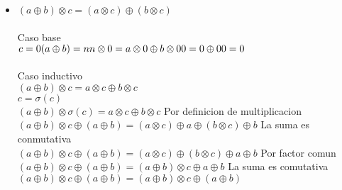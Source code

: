 \documentclass{article}
\begin{document}
\begin{itemize}
        
        \item{$(a\oplus b)\otimes c = (a\otimes c) \oplus (b \otimes c)$}\\
        \\
        Caso base\\
        \begin{math}
        c=0\\
        (a\oplus b)=n\\
        n\otimes 0 = a\otimes 0 \oplus b \otimes 0\\
        0 = 0 \oplus 0\\
        0 = 0\\
        \end{math}\\
        \\
        Caso inductivo\\
        {$(a \oplus b)\otimes c= a\otimes c  \oplus  b \otimes c $}\\
          {$c=\sigma(c)$}\\
        {$(a \oplus b)\otimes \sigma(c)= a\otimes c  \oplus  b \otimes c $} Por definicion de multiplicacion\\
        {$(a \oplus b)\otimes c\oplus (a \oplus b)= (a\otimes c)\oplus a  \oplus ( b \otimes c) \oplus b $} La suma es conmutativa\\
        {$(a \oplus b)\otimes c\oplus (a \oplus b)= (a\otimes c)  \oplus ( b \otimes c) \oplus a\oplus b $} Por factor comun\\
        {$(a \oplus b)\otimes c\oplus (a \oplus b)= (a\oplus b)  \otimes c  \oplus a\oplus b $} La suma es comutativa\\
        {$(a \oplus b)\otimes c\oplus (a \oplus b)= (a\oplus b)  \otimes c  \oplus (a\oplus b) $}\\
        
       
\end{itemize}

\begin{math}
\end{math}
\end{document}
